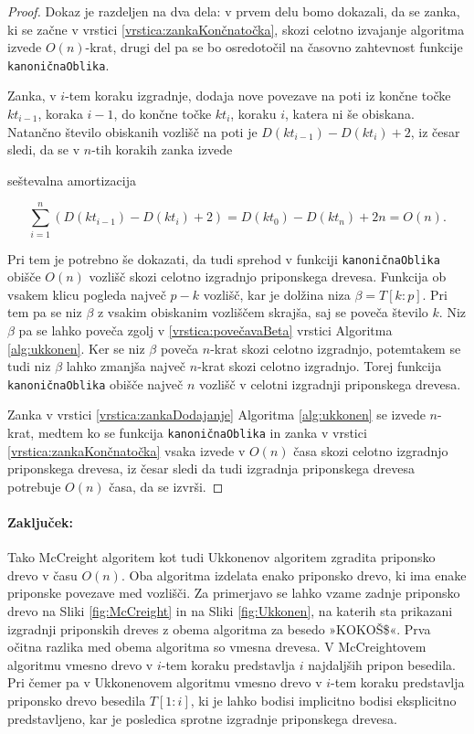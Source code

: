 \begin{proof}

Dokaz je razdeljen na dva dela: v prvem delu bomo dokazali, da se zanka, ki se začne v vrstici \ref{vrstica:zankaKončnatočka}, skozi celotno izvajanje algoritma izvede $O(n)$-krat, drugi del pa se bo osredotočil na časovno zahtevnost funkcije \texttt{kanoničnaOblika}.

Zanka, v $i$-tem koraku izgradnje, dodaja nove povezave na poti iz končne točke $kt_{i-1}$, koraka $i-1$, do končne točke $kt_i$, koraku $i$, katera ni še obiskana. Natančno število obiskanih vozlišč na poti je $D(kt_{i-1})-D(kt_i)+2$, iz česar sledi, da se v $n$-tih korakih zanka izvede

seštevalna amortizacija

$$
    \sum_{i=1}^n \left(D(kt_{i-1})-D(kt_i)+2\right)=D(kt_0)-D(kt_n)+2n=O(n).
$$

Pri tem je potrebno še dokazati, da tudi sprehod v funkciji \texttt{kanoničnaOblika} obišče $O(n)$ vozlišč skozi celotno izgradnjo priponskega drevesa. Funkcija ob vsakem klicu pogleda največ $p-k$ vozlišč, kar je dolžina niza $\beta=T[k:p]$. Pri tem pa se niz $\beta$ z vsakim obiskanim vozliščem skrajša, saj se poveča število $k$. Niz $\beta$ pa se lahko poveča zgolj v \ref{vrstica:povečavaBeta} vrstici Algoritma \ref{alg:ukkonen}. Ker se niz $\beta$ poveča $n$-krat skozi celotno izgradnjo, potemtakem se tudi niz $\beta$ lahko zmanjša največ $n$-krat skozi celotno izgradnjo. Torej funkcija \texttt{kanoničnaOblika} obišče največ $n$ vozlišč v celotni izgradnji priponskega drevesa.


Zanka v vrstici \ref{vrstica:zankaDodajanje} Algoritma \ref{alg:ukkonen} se izvede $n$-krat, medtem ko se funkcija \texttt{kanoničnaOblika} in zanka v vrstici \ref{vrstica:zankaKončnatočka} vsaka izvede v $O(n)$ časa skozi celotno izgradnjo priponskega drevesa, iz česar sledi da tudi izgradnja priponskega drevesa potrebuje $O(n)$ časa, da se izvrši.
  
\end{proof}

\paragraph{Zaključek:}
Tako McCreight algoritem \cite{McCreight1976} kot tudi  Ukkonenov algoritem \cite{Ukkonen1995} zgradita priponsko drevo v času $O(n)$. Oba algoritma izdelata enako priponsko drevo, ki ima enake priponske povezave med vozlišči. Za primerjavo se lahko vzame zadnje priponsko drevo na Sliki \ref{fig:McCreight} in na Sliki \ref{fig:Ukkonen}, na katerih sta prikazani izgradnji priponskih dreves z obema algoritma za besedo »KOKOŠ\$«. Prva očitna razlika med obema algoritma so vmesna drevesa. V McCreightovem algoritmu vmesno drevo v $i$-tem koraku predstavlja $i$ najdaljših pripon besedila. Pri čemer pa v Ukkonenovem algoritmu vmesno drevo v $i$-tem koraku predstavlja priponsko drevo besedila $T[1:i]$, ki je lahko bodisi implicitno bodisi eksplicitno predstavljeno, kar je posledica sprotne izgradnje priponskega drevesa.

